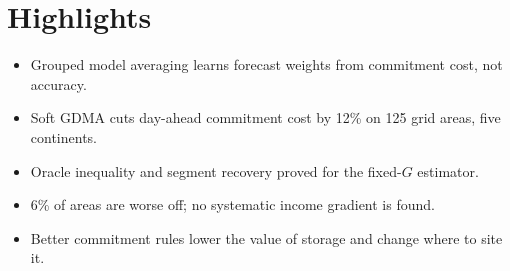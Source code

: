 \documentclass[11pt]{article}
\begin{document}
\section*{Highlights}
\begin{itemize}
\item Grouped model averaging learns forecast weights from commitment cost, not accuracy.
\item Soft GDMA cuts day-ahead commitment cost by 12\% on 125 grid areas, five continents.
\item Oracle inequality and segment recovery proved for the fixed-$G$ estimator.
\item 6\% of areas are worse off; no systematic income gradient is found.
\item Better commitment rules lower the value of storage and change where to site it.
\end{itemize}
\end{document}
